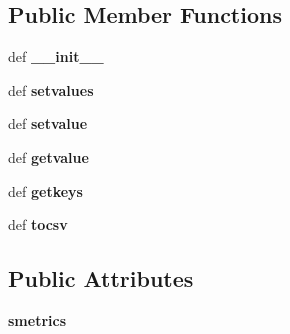 \subsection*{Public Member Functions}
\begin{DoxyCompactItemize}
\item 
\hypertarget{classperflogserver_1_1_server_metrics_a076d6ef890221415b692523a083311ba}{def {\bfseries \+\_\+\+\_\+init\+\_\+\+\_\+}}\label{classperflogserver_1_1_server_metrics_a076d6ef890221415b692523a083311ba}

\item 
\hypertarget{classperflogserver_1_1_server_metrics_a9ac27571dc136c3d95352c333c675448}{def {\bfseries setvalues}}\label{classperflogserver_1_1_server_metrics_a9ac27571dc136c3d95352c333c675448}

\item 
\hypertarget{classperflogserver_1_1_server_metrics_af49997541237deb3b9d881aeb3cb9cc4}{def {\bfseries setvalue}}\label{classperflogserver_1_1_server_metrics_af49997541237deb3b9d881aeb3cb9cc4}

\item 
\hypertarget{classperflogserver_1_1_server_metrics_a2a6d2f6ad8e874fa31231526b81101e1}{def {\bfseries getvalue}}\label{classperflogserver_1_1_server_metrics_a2a6d2f6ad8e874fa31231526b81101e1}

\item 
\hypertarget{classperflogserver_1_1_server_metrics_a0b49c6e7bf6302a9682bb4fbd29fe474}{def {\bfseries getkeys}}\label{classperflogserver_1_1_server_metrics_a0b49c6e7bf6302a9682bb4fbd29fe474}

\item 
\hypertarget{classperflogserver_1_1_server_metrics_a5f3e683696ced34e0ddb6a77fac23984}{def {\bfseries tocsv}}\label{classperflogserver_1_1_server_metrics_a5f3e683696ced34e0ddb6a77fac23984}

\end{DoxyCompactItemize}
\subsection*{Public Attributes}
\begin{DoxyCompactItemize}
\item 
\hypertarget{classperflogserver_1_1_server_metrics_ae965da8b6861a98e963faebe3e66e586}{{\bfseries smetrics}}\label{classperflogserver_1_1_server_metrics_ae965da8b6861a98e963faebe3e66e586}

\end{DoxyCompactItemize}
